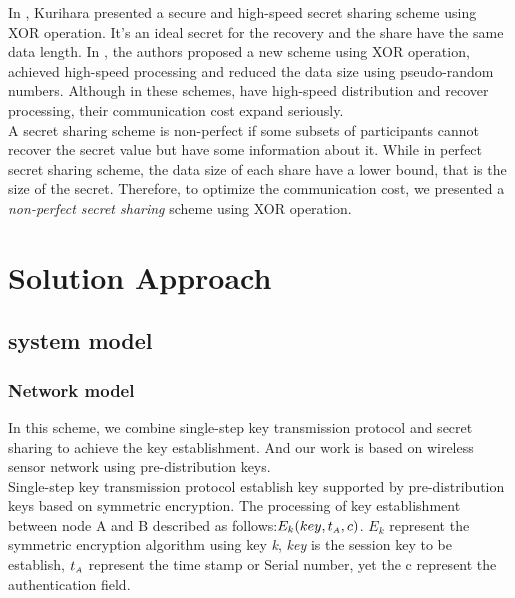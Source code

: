 \documentclass[nocopyrightspace,9pt]{sigplanconf}
\begin{document}
In \cite{kurihara2008fast}, Kurihara presented a secure and high-speed secret sharing scheme
using XOR operation. It's an ideal secret for the recovery and the share have the
same data length. In \cite{nagai2013key}, the authors proposed a new scheme using
XOR operation, achieved high-speed processing and reduced the data size using
pseudo-random numbers. Although in these schemes, have high-speed distribution
and recover processing, their communication cost expand seriously.\\

A secret sharing scheme is non-perfect if some subsets of participants cannot recover
the secret value but have some information about it\cite{farras2014optimal}.
While in perfect secret sharing scheme, the data size of each share have a lower bound,
that is the size of the secret. Therefore, to optimize the communication cost, we
presented a \textit{non-perfect secret sharing} scheme using XOR operation.
\section{Solution Approach}
\subsection{system model}
\subsubsection*{Network model}
In this scheme, we combine single-step key transmission protocol and secret sharing to
achieve the key establishment. And our work is based on wireless sensor network using
pre-distribution keys.\\

Single-step key transmission protocol establish key supported by
pre-distribution keys based on symmetric encryption. The processing of key establishment
between node A and B described as follows:$E_{k}(key,t_\mathsmaller{A},c)$. $E_k$
represent the symmetric encryption algorithm using
key \textit{k}, \textit{key} is the session key to be establish,
$t_\mathsmaller{A}$ represent the time stamp or Serial number, yet the c represent the authentication field.\\

\end{document}
